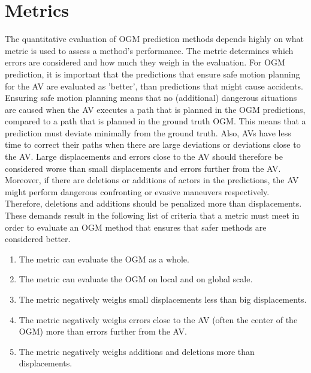 


\newpage

\section{Metrics} \label{sec:metrics}

The quantitative evaluation of \gls{OGM} prediction methods depends highly on what metric is used to assess a method's performance. The metric determines which errors are considered and how much they weigh in the evaluation. For \gls{OGM} prediction, it is important that the predictions that ensure safe motion planning for the \gls{AV} are evaluated as 'better', than predictions that might cause accidents. Ensuring safe motion planning means that no (additional) dangerous situations are caused when the \gls{AV} executes a path that is planned in the \gls{OGM} predictions, compared to a path that is planned in the ground truth \gls{OGM}. This means that a prediction must deviate minimally from the ground truth. Also, \glspl{AV} have less time to correct their paths when there are large deviations or deviations close to the \gls{AV}. Large displacements and errors close to the \gls{AV} should therefore be considered worse than small displacements and errors further from the \gls{AV}. Moreover, if there are deletions or additions of actors in the predictions, the \gls{AV} might perform dangerous confronting or evasive maneuvers respectively. Therefore, deletions and additions should be penalized more than displacements. These demands result in the following list of criteria that a metric must meet in order to evaluate an \gls{OGM} method that ensures that safer methods are considered better.  

\begin{enumerate}
	\item The metric can evaluate the \gls{OGM} as a whole.
	\item The metric can evaluate the \gls{OGM} on local and on global scale.
	\item The metric negatively weighs small displacements less than big displacements. 
	\item The metric negatively weighs errors close to the \gls{AV} (often the center of the \gls{OGM}) more than errors further from the \gls{AV}.
	\item The metric negatively weighs additions and deletions more than displacements.
\end{enumerate}


